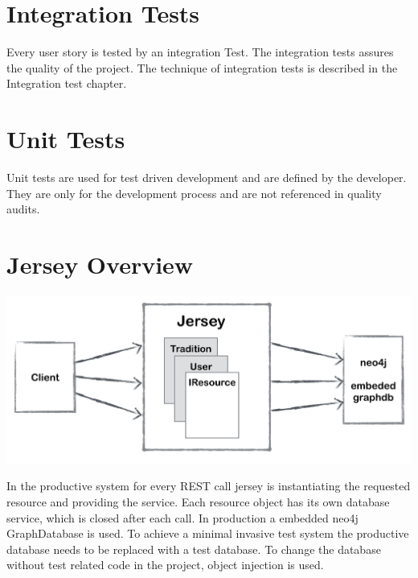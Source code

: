 \documentclass[11pt,fleqn,openany]{book} %
\begin{document}
\section*{Integration Tests}
Every user story is tested by an integration Test. The integration tests assures the quality of the project. The technique of integration tests is described in the Integration test chapter. 

\section*{Unit Tests}
Unit tests are used for test driven development and are defined by the developer. They are only for the development process and are not referenced in quality audits.

\newpage

\section*{Jersey Overview} 

\begin{center}
\includegraphics[scale=.40]{Pictures/jerseyoverview.png} 
\end{center}

In the productive system for every REST call jersey is instantiating the requested resource and providing the service. Each resource object has its own database service, which is closed after each call. In production a embedded neo4j GraphDatabase is used. To achieve a minimal invasive test system the productive database needs to be replaced with a test database. To change the database without test related code in the project, object injection is used. 
\end{document}
